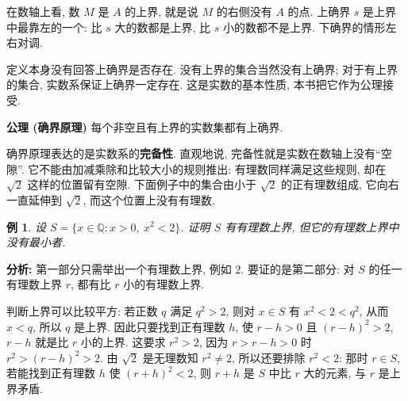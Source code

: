 \documentclass[UTF8,openany]{ctexbook}
\theoremstyle{chinesetextbook}
\newtheorem{example}{例}[section]
\begin{document}
在数轴上看, 数 $M$ 是 $A$ 的上界, 就是说 $M$ 的右侧没有 $A$ 的点. 上确界 $s$ 是上界中最靠左的一个: 比 $s$ 大的数都是上界, 比 $s$ 小的数都不是上界. 下确界的情形左右对调.

定义本身没有回答上确界是否存在. 没有上界的集合当然没有上确界; 对于有上界的集合, 实数系保证上确界一定存在. 这是实数的基本性质, 本书把它作为公理接受.

\par\indent\textbf{公理 (确界原理)} 每个非空且有上界的实数集都有上确界.

确界原理表达的是实数系的\textbf{完备性}. 直观地说, 完备性就是实数在数轴上没有“空隙”. 它不能由加减乘除和比较大小的规则推出: 有理数同样满足这些规则, 却在 $\sqrt2$ 这样的位置留有空隙. 下面例子中的集合由小于 $\sqrt2$ 的正有理数组成, 它向右一直延伸到 $\sqrt2$, 而这个位置上没有有理数.
\begin{example}
设 $S=\{x\in\mathbb Q:x>0,\ x^2<2\}$. 证明 $S$ 有有理数上界, 但它的有理数上界中没有最小者.
\end{example}
\par\indent\textbf{分析:} 第一部分只需举出一个有理数上界, 例如 $2$. 要证的是第二部分: 对 $S$ 的任一有理数上界 $r$, 都有比 $r$ 小的有理数上界.

判断上界可以比较平方: 若正数 $q$ 满足 $q^2>2$, 则对 $x\in S$ 有 $x^2<2<q^2$, 从而 $x<q$, 所以 $q$ 是上界. 因此只要找到正有理数 $h$, 使 $r-h>0$ 且 $(r-h)^2>2$, $r-h$ 就是比 $r$ 小的上界. 这要求 $r^2>2$, 因为 $r>r-h>0$ 时 $r^2>(r-h)^2>2$. 由 $\sqrt2$ 是无理数知 $r^2\ne2$, 所以还要排除 $r^2<2$: 那时 $r\in S$, 若能找到正有理数 $h$ 使 $(r+h)^2<2$, 则 $r+h$ 是 $S$ 中比 $r$ 大的元素, 与 $r$ 是上界矛盾.
\end{document}
